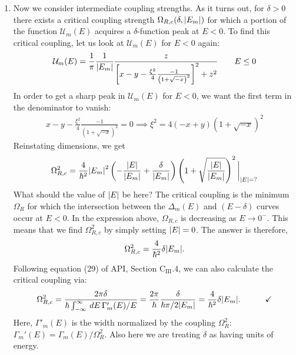 \documentclass{article}
\theoremstyle{definition}
\newcommand{\f}[2]{\frac{#1}{#2}}
\newcommand{\lp}{\left(}
\newcommand{\rp}{\right)}
\newcommand{\lb}{\left[}
\newcommand{\rb}{\right]}
\begin{document}
\begin{enumerate}[label=(\alph*)]
\item Now we consider intermediate coupling strengths. As it turns out, for $\delta > 0$ there exists a critical coupling strength  $\Omega_{R,c}(\delta, \abs{E_m})$ for which a portion of the function $\mathcal{U}_m(E)$ acquires a $\delta$-function peak at $E < 0$. To find this critical coupling, let us look at $\mathcal{U}_m(E)$ for $E<0$ again:
\begin{align*}
\mathcal{U}_m(E) = \f{1}{\pi} \f{1}{\abs{E_m}} \f{z}{ \lb x - y - \f{\xi^2}{4} \f{-1}{\lp 1 + \sqrt{-x} \rp^2} \rb^2 +  z^2} \quad\quad E \leq 0
\end{align*}
In order to get a sharp peak in $\mathcal{U}_m(E)$ for $E<0$, we want the first term in the denominator to vanish:
\begin{align*}
x - y - \f{\xi^2}{4} \f{-1}{\lp1 + \sqrt{-x} \rp^2} = 0 \implies \xi^2 = 4(-x+y) \lp 1 + \sqrt{-x}\rp^2
\end{align*}
Reinstating dimensions, we get
\begin{align*}
\Omega_{R,c}^2 = \f{4}{\hbar^2}\abs{E_m}^2 \lp -\f{\abs{E}}{\abs{E_m}} + \f{\delta}{\abs{E_m}} \rp \lp 1 + \sqrt{\f{\abs{E}}{\abs{E_m}}} \rp^2\bigg\vert_{\abs{E} = ?}
\end{align*}
What should the value of $\abs{E}$ be here? The critical coupling is the minimum $\Omega_{R}$ for which the intersection between the $\Delta_m(E)$ and $(E-\delta)$ curves occur at $E<0$. In the expression above, $\Omega_{R,c}$ is decreasing as $E \to 0^-$. This means that we find $\Omega_{R,c}^2$ by simply setting $\abs{E} = 0$. The answer is therefore,
\begin{align*}
\Omega_{R,c}^2 = \f{4}{\hbar^2} \delta \abs{E_m}. 
\end{align*}
Following equation (29) of API, Section C$_\text{III}$.4, we can also calculate the critical coupling via:
\begin{align*}
\Omega_{R,c}^2 = \f{2\pi \delta}{\hbar \int_{-\infty}^\infty \, dE \, \Gamma'_m(E)/E} = \f{2\pi}{\hbar} \f{\delta}{ \hbar \pi / 2\abs{E_m}} = \f{4}{\hbar^2}\delta \abs{E_m}. \quad\quad\quad \checkmark
\end{align*}
Here, $\Gamma'_m(E)$ is the width normalized by the coupling $\Omega_R^2$: $\Gamma_m'(E) = \Gamma_m(E)/\Omega_R^2$. Also here we are treating $\delta$ as having units of energy. 


\end{enumerate}
\end{document}
